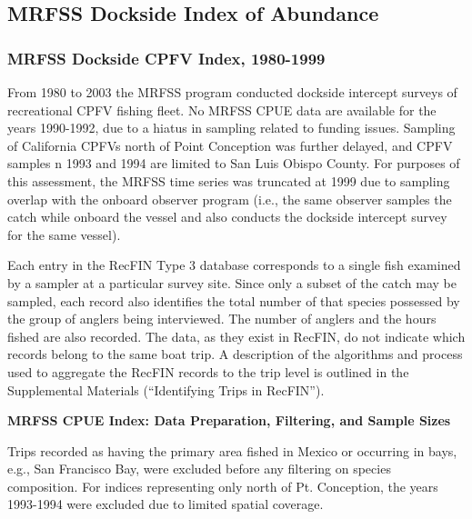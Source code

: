 \documentclass[
  english,
  a4paper,
]{article}
\begin{document}
\clearpage

\hypertarget{mrfss-index}{%
\subsection{MRFSS Dockside Index of Abundance}\label{mrfss-index}}

\hypertarget{mrfss-dockside-cpfv-index-1980-1999}{%
\subsubsection{MRFSS Dockside CPFV Index, 1980-1999}\label{mrfss-dockside-cpfv-index-1980-1999}}

From 1980 to 2003 the MRFSS program conducted dockside intercept surveys of
recreational CPFV fishing fleet. No MRFSS CPUE data are available for the years
1990-1992, due to a hiatus in sampling related to funding issues. Sampling of
California CPFVs north of Point Conception was further delayed, and CPFV samples
n 1993 and 1994 are limited to San Luis Obispo County.
For purposes of this assessment, the MRFSS time series was truncated at 1999 due
to sampling overlap with the
onboard observer program (i.e., the same observer samples the catch while
onboard the vessel and also conducts the dockside intercept survey for
the same vessel).

Each entry in the RecFIN Type 3 database corresponds to a
single fish examined by a sampler at a particular survey site. Since only a
subset of the catch may be sampled, each record also
identifies the total number of that species possessed by the group of anglers
being interviewed. The number of anglers and the hours fished are also recorded.
The data, as they exist in RecFIN, do not indicate which records
belong to the same boat trip. A description of the algorithms and process used to
aggregate the RecFIN records to the trip level is outlined in the Supplemental Materials
(``Identifying Trips in RecFIN'').

\textbf{MRFSS CPUE Index: Data Preparation, Filtering, and Sample Sizes}

Trips recorded as having the primary area fished in Mexico or occurring in bays, e.g.,
San Francisco Bay, were excluded before any filtering on species composition.
For indices representing only north of Pt. Conception, the years 1993-1994 were
excluded due to limited spatial coverage.
\end{document}
